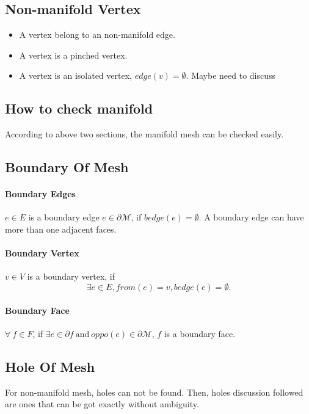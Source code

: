 \documentclass[9pt,twocolumn]{extarticle}
\begin{document}
\subsection{Non-manifold Vertex}

\begin{itemize}
\item A vertex belong to an non-manifold edge.
\item A vertex is a pinched vertex.
\item A vertex is an isolated vertex, $edge(v)=\emptyset$. 
{\color{red} Maybe need to discuss}
\end{itemize}

\subsection{How to check manifold}

According to above two sections, the manifold mesh can be checked easily.

\subsection{Boundary Of Mesh}
\paragraph{Boundary Edges} $e\in E$ is a boundary edge $e\in \partial \mathcal{M}$,
if $bedge(e)=\emptyset$. A boundary edge can have more than one adjacent faces.
\paragraph{Boundary Vertex} $v\in V$ is a boundary vertex, if
\begin{equation}
\exists e\in E, from(e)=v, bedge(e)=\emptyset.
\end{equation}
\paragraph{Boundary Face} $\forall \ f\in F$, if 
$\exists e \in \partial f\ \mbox{and}\ oppo(e) \in \partial \mathcal{M}$, 
$f$ is a boundary face.


\subsection{Hole Of Mesh}
For non-manifold mesh, holes can not be found. Then, holes discussion followed 
are ones that can be got exactly without ambiguity.
\end{document}

